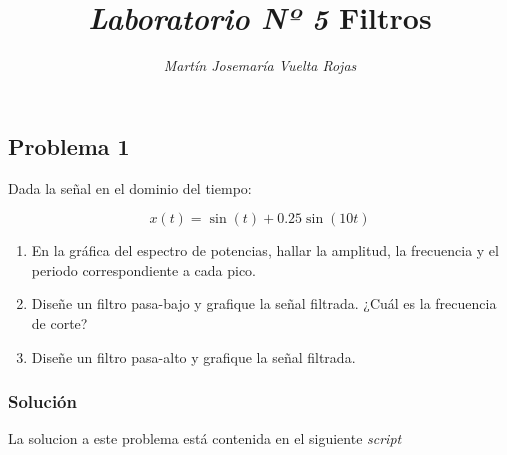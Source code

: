 \documentclass[a4paper,12pt,final]{article}
\begin{document}
  \title{\textit{\Large Laboratorio Nº 5}\linebreak{}\linebreak{}
  \textbf{\Huge Filtros}}
  \author{\emph{Martín Josemaría Vuelta Rojas}}
  \maketitle

  \subsection*{Problema 1}
    \noindent Dada la señal en el dominio del tiempo:

      $$x\left(t\right) = \sin\left(t\right) + 0.25\sin\left(10t\right)$$

      \begin{enumerate}[label=\alph*)]
        \item En la gráfica del espectro de potencias, hallar la amplitud,
              la frecuencia y el periodo correspondiente a cada pico.
        \item Diseñe un filtro pasa-bajo y grafique la señal filtrada.
              ¿Cuál es la frecuencia de corte?
        \item Diseñe un filtro pasa-alto y grafique la señal filtrada.
    \end{enumerate}

    \subsubsection*{Solución}
      \noindent La solucion a este problema está contenida en el siguiente \emph{script}
      \begin{listing}[H]
        \label{script:1.1a}
        \inputminted[lastline=21]{matlab}{./laboratorio_5/problema01.m}
      \end{listing}
      \vspace{-1em}
      \vfill

      \newpage
      \vspace{-1em}
      \begin{listing}[H]
        \label{scr:1.1b}
        \inputminted[firstline=23,lastline=80]{matlab}{./laboratorio_5/problema01.m}
      \end{listing}
      \vspace{-1em}
      \vfill
\end{document}
